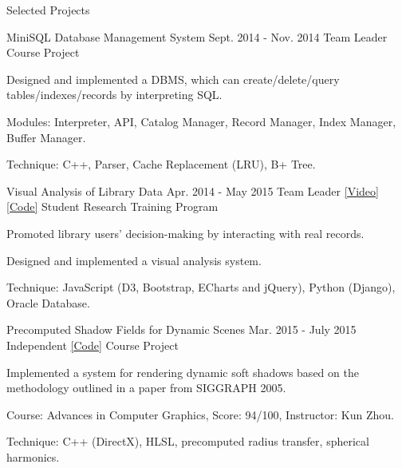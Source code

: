 \documentclass{resume} %
\begin{document}
\begin{rSection}{Selected Projects}



\begin{rSubsectionTag}
	{MiniSQL Database Management System}
	{Sept. 2014 - Nov. 2014}
	{Team Leader}
	{}
	{Course Project}
\item Designed and implemented a DBMS, which can create/delete/query tables/indexes/records by interpreting SQL.
\item Modules: Interpreter, API, Catalog Manager, Record Manager, Index Manager, Buffer Manager.
\item Technique: C++, Parser, Cache Replacement (LRU), B+ Tree.
\end{rSubsectionTag}

\begin{rSubsectionTag}
	{Visual Analysis of Library Data}
	{Apr. 2014 - May 2015}
	{Team Leader}
	{\href{https://youtu.be/MhnXvG_KWZs}{[Video]}
		\href{https://github.com/nblintao/Visual-Analysis-of-Library-Data}{[Code]}}
	{Student Research Training Program}
\item Promoted library users' decision-making by interacting with real records.  
\item Designed and implemented a visual analysis system.
\item Technique: JavaScript (D3, Bootstrap, ECharts and jQuery), Python (Django), Oracle Database.
\end{rSubsectionTag}


\begin{rSubsectionTag}
	{Precomputed Shadow Fields for Dynamic Scenes}
	{Mar. 2015 - July 2015}
	{Independent}
	{\href{https://github.com/nblintao/Precomputed-Shadow-Fields-for-Dynamic-Scenes}{[Code]}}
	{Course Project}
\item Implemented a system for rendering dynamic soft shadows based on the methodology outlined in a paper from SIGGRAPH 2005.
\item Course: Advances in Computer Graphics, Score: 94/100, Instructor: Kun Zhou.
\item Technique: C++ (DirectX), HLSL, precomputed radius transfer, spherical harmonics.
\end{rSubsectionTag}




\end{rSection}
\end{document}
